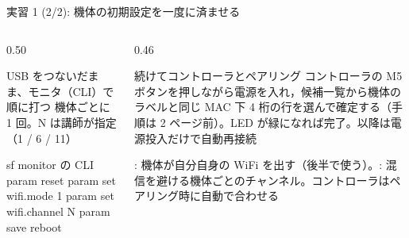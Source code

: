\begin{frame}[fragile]{実習 1 (2/2): 機体の初期設定を一度に済ませる}
  \vspace{0.2em}
  \begin{columns}[T]
    \begin{column}{0.50\textwidth}
      \begin{block}{USB をつないだまま、モニタ（CLI）で順に打つ}
        \footnotesize 機体ごとに 1 回。N は講師が指定（1 / 6 / 11）
        \begin{sflisting}[basicstyle=\ttfamily\scriptsize]{sf monitor の CLI}
param reset
param set wifi.mode 1
param set wifi.channel N
param save
reboot
        \end{sflisting}
      \end{block}
    \end{column}
    \begin{column}{0.46\textwidth}
      \begin{exampleblock}{続けてコントローラとペアリング}
        \footnotesize コントローラの M5 ボタンを押しながら電源を入れ，候補一覧から機体のラベルと同じ MAC 下 4 桁の行を選んで確定する（手順は 2 ページ前）。LED が緑になれば完了。以降は電源投入だけで自動再接続
      \end{exampleblock}
      {\footnotesize {}: 機体が自分自身の WiFi を出す（後半で使う）。: 混信を避ける機体ごとのチャンネル。コントローラはペアリング時に自動で合わせる}
    \end{column}
  \end{columns}
\end{frame}

